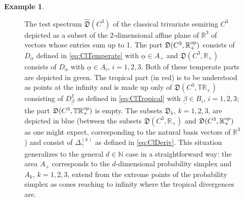 \documentclass[12pt,a4paper,reqno]{amsart}
\theoremstyle{definition}
\newtheorem{example}[proposition]{Example}
\newcommand{\mf}[1]{\mathfrak{#1}}
\newcommand{\N}{\mathbb N}
\newcommand{\R}{\mathbb R}
\newcommand{\T}{\mathbb T}
\begin{document}
\begin{example}
\begin{figure}
\begin{center}
\caption{\label{fig:Restricted} The test spectrum $\hat{\mf D}(C^3)$ of the classical trivariate semiring $C^3$ depicted as a subset of the 2-dimensional affine plane of $\R^3$ of vectors whose entries sum up to 1. The part $\mf D(C^3,\R_+^{\rm op})$ consists of $D_{\underline{\alpha}}$ defined in \eqref{eq:ClTemperate} with $\underline{\alpha}\in A_+$ and $\mf D(C^3,\R_+)$ consists of $D_{\underline{\alpha}}$ with $\underline{\alpha}\in A_i$, $i=1,2,3$. Both of these temperate parts are depicted in green. The tropical part (in red) is to be understood as points at the infinity and is made up only of $\mf D(C^3,\T\R_+)$ consisting of $D^\T_{\underline{\beta}}$ as defined in \eqref{eq:ClTropical} with $\underline{\beta}\in B_i$, $i=1,2,3$; the part $\mf D(C^3,\T\R_+^{\rm op})$ is empty. The subsets $\mf D_k$, $k=1,2,3$, are depicted in blue (between the subsets $\mf D(C^3,\R_+)$ and $\mf D(C^3,\R_+^{\rm op})$ as one might expect, corresponding to the natural basis vectors of $\R^3$) and consist of $\Delta^{(k)}_{\underline{\gamma}}$ as defined in \eqref{eq:ClDeriv}. This situation generalizes to the general $d\in\N$ case in a straightforward way: the area $A_+$ corresponds to the $d$-dimensional probability simplex and $A_k$, $k=1,2,3$, extend from the extreme points of the probability simplex as cones reaching to infinity where the tropical divergences are.
}
\end{center}
\end{figure}


\end{example}
\end{document}
